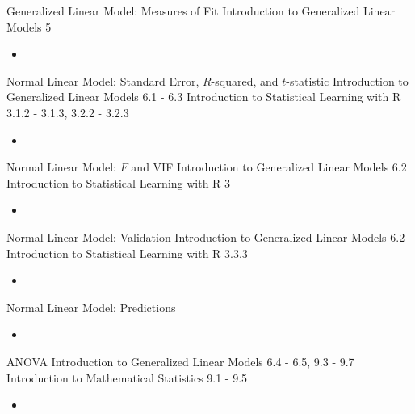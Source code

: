 \documentclass[12pt, titlepage, french]{report}
\begin{document}
\begin{CHPT_SUMM_AUTO_NUMB}[label = {L.-46}]{Generalized Linear Model: Measures of Fit}
Introduction to Generalized Linear Models 5
	\begin{itemize}
		\item	
	\end{itemize}
\end{CHPT_SUMM_AUTO_NUMB}

\begin{CHPT_SUMM_AUTO_NUMB}[label = {L.-47}]{{Normal Linear Model: Standard Error, $R$-squared, and $t$-statistic}}
Introduction to Generalized Linear Models 6.1 - 6.3
Introduction to Statistical Learning with R 3.1.2 - 3.1.3, 3.2.2 - 3.2.3
	\begin{itemize}
		\item	
	\end{itemize}
\end{CHPT_SUMM_AUTO_NUMB}

\begin{CHPT_SUMM_AUTO_NUMB}[label = {L.-48}]{Normal Linear Model: $F$ and VIF}
Introduction to Generalized Linear Models 6.2
Introduction to Statistical Learning with R 3
	\begin{itemize}
		\item	
	\end{itemize}
\end{CHPT_SUMM_AUTO_NUMB}

\begin{CHPT_SUMM_AUTO_NUMB}[label = {L.-49}]{Normal Linear Model: Validation}
Introduction to Generalized Linear Models 6.2
Introduction to Statistical Learning with R 3.3.3
	\begin{itemize}
		\item	
	\end{itemize}
\end{CHPT_SUMM_AUTO_NUMB}

\begin{CHPT_SUMM_AUTO_NUMB}[label = {L.-50}]{Normal Linear Model: Predictions}
	\begin{itemize}
		\item	
	\end{itemize}
\end{CHPT_SUMM_AUTO_NUMB}

\begin{CHPT_SUMM_AUTO_NUMB}[label = {L.-51}]{ANOVA}
Introduction to Generalized Linear Models 6.4 - 6.5, 9.3 - 9.7
Introduction to Mathematical Statistics 9.1 - 9.5
	\begin{itemize}
		\item	
	\end{itemize}
\end{CHPT_SUMM_AUTO_NUMB}
\end{document}
